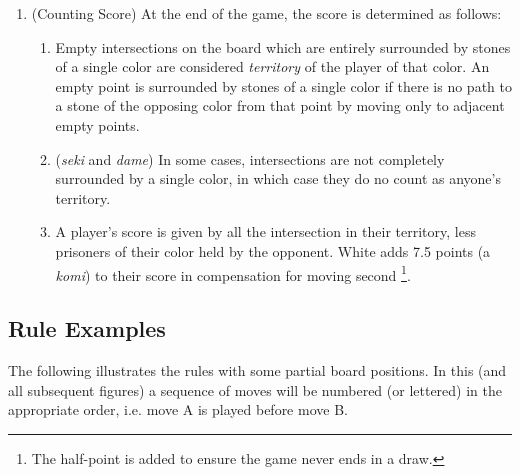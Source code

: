 \documentclass[../math194_paper.tex]{subfiles}
\begin{document}
\begin{enumerate}
\begin{enumerate}
    from the board and treated as prisoners of the player who could capture them \footnote{In practice, if
    there is a disagreement, the players
    can continue playing until said stones are captured. It can be shown that this results in the same score
    if the stone are    
    captured using the minimal number of moves. This rule exists to speed up the game such that
    two skilled players can avoid playing out trivial positions where the result is known ahead of time. 
    As such, we can ignore this part of the rule in our mathematical treatment of the rules.}.
\end{enumerate}
\item (Counting Score) At the end of the game, the score is determined as follows:
\begin{enumerate} 
    \item Empty intersections on the board which are entirely surrounded by stones of a single color 
    are considered \textit{territory} of the player of that color. An empty point is surrounded by stones of a
    single color if there is no path to a stone of the opposing color from that point by moving only to adjacent
    empty points.
    \item (\textit{seki} and \textit{dame}) In some cases, intersections are not completely surrounded by a
    single color, in which case they do no count as anyone's territory.
    \item A player's score is given by all the intersection in their territory, less prisoners of their color 
    held by the opponent. White adds 7.5 points (a \textit{komi}) to their score in compensation for moving 
    second \footnote{The half-point is added to ensure the game never ends in a draw.}.
\end{enumerate}
\end{enumerate}

\subsection{Rule Examples}
The following illustrates the rules with some partial board positions. In this (and all 
subsequent figures) a sequence of moves will be numbered (or lettered) in the appropriate 
order, i.e. move A is played before move B.
\end{document}

